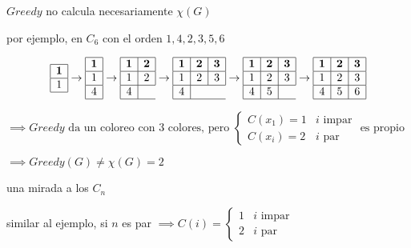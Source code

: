 \documentclass{article}
\begin{document}
$Greedy$ no calcula necesariamente $\chi(G)$

por ejemplo, en $C_6$ con el orden $1, 4, 2, 3, 5, 6$

\[
\begin{array}{|c|}
\hline
\textbf{1} \\
\hline
1 \\
\hline
\end{array}
\rightarrow
\begin{array}{|c|}
\hline
\textbf{1} \\
\hline
1 \\
\hline
4 \\
\hline
\end{array}
\rightarrow
\begin{array}{|c|c|}
\hline
\textbf{1} &  \textbf{2}\\
\hline
1  & 2 \\
\hline
4 \\
\hline
\end{array}
\rightarrow
\begin{array}{|c|c|c|}
\hline
\textbf{1} &  \textbf{2} & \textbf{3} \\
\hline
1  & 2  & 3 \\
\hline
4 \\
\hline
\end{array}
\rightarrow
\begin{array}{|c|c|c|}
\hline
\textbf{1} &  \textbf{2} & \textbf{3} \\
\hline
1  & 2  & 3 \\
\hline
4  & 5 \\
\hline
\end{array}
\rightarrow
\begin{array}{|c|c|c|}
\hline
\textbf{1} &  \textbf{2} & \textbf{3} \\
\hline
1  & 2  & 3 \\
\hline
4  & 5  & 6\\
\hline
\end{array}
\]

\(
\implies Greedy \text{ da un coloreo con } 3 \text{ colores, pero } 
\begin{cases}
C(x_1) = 1 & i \text{ impar}\\
C(x_i) = 2 & i \text{ par}
\end{cases} \text{ es propio} 
\) 

\(
\implies Greedy(G) \neq \chi(G) = 2
\) \bigskip

una mirada a los $C_n$

similar al ejemplo, si $n$ es par 
\(\implies C(i) = \begin{cases} 1 & i \text{ impar} \\ 2 & i \text{ par}\end{cases}\)
\end{document}
